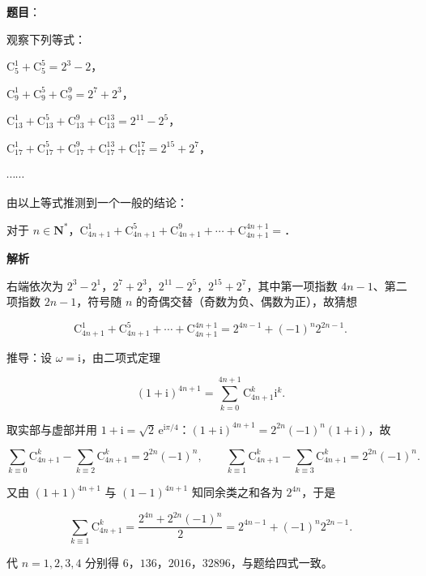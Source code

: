 \begin{answer}

\textbf{题目}：

观察下列等式：

$\mathrm C_5^1+\mathrm C_5^5=2^3-2$，

$\mathrm C_9^1+\mathrm C_9^5+\mathrm C_9^9=2^7+2^3$，

$\mathrm C_{13}^1+\mathrm C_{13}^5+\mathrm C_{13}^9+\mathrm C_{13}^{13}=2^{11}-2^5$，

$\mathrm C_{17}^1+\mathrm C_{17}^5+\mathrm C_{17}^9+\mathrm C_{17}^{13}+\mathrm C_{17}^{17}=2^{15}+2^7$，

$\cdots\cdots$

由以上等式推测到一个一般的结论：

对于 $n\in\mathbf N^*$，$\mathrm C_{4n+1}^1+\mathrm C_{4n+1}^5+\mathrm C_{4n+1}^9+\cdots+\mathrm C_{4n+1}^{4n+1}=$\gkblank{}．

\textbf{解析}

右端依次为 $2^3-2^1$，$2^7+2^3$，$2^{11}-2^5$，$2^{15}+2^7$，其中第一项指数 $4n-1$、第二项指数 $2n-1$，符号随 $n$ 的奇偶交替（奇数为负、偶数为正），故猜想

\nopagebreak[4]
\[\mathrm C_{4n+1}^1+\mathrm C_{4n+1}^5+\cdots+\mathrm C_{4n+1}^{4n+1}=2^{4n-1}+(-1)^n2^{2n-1}.\]

推导：设 $\omega=\mathrm i$，由二项式定理

\nopagebreak[4]
\[(1+\mathrm i)^{4n+1}=\sum_{k=0}^{4n+1}\mathrm C_{4n+1}^k\mathrm i^k.\]

取实部与虚部并用 $1+\mathrm i=\sqrt2\,\mathrm e^{\mathrm i\pi/4}$：$(1+\mathrm i)^{4n+1}=2^{2n}(-1)^n(1+\mathrm i)$，故

\nopagebreak[4]
\[\sum_{k\equiv0}\mathrm C_{4n+1}^k-\sum_{k\equiv2}\mathrm C_{4n+1}^k=2^{2n}(-1)^n,\qquad
\sum_{k\equiv1}\mathrm C_{4n+1}^k-\sum_{k\equiv3}\mathrm C_{4n+1}^k=2^{2n}(-1)^n.\]

又由 $(1+1)^{4n+1}$ 与 $(1-1)^{4n+1}$ 知同余类之和各为 $2^{4n}$，于是

\nopagebreak[4]
\[\sum_{k\equiv1}\mathrm C_{4n+1}^k=\frac{2^{4n}+2^{2n}(-1)^n}{2}=2^{4n-1}+(-1)^n2^{2n-1}.\]

代 $n=1,2,3,4$ 分别得 $6$，$136$，$2016$，$32896$，与题给四式一致。


\end{answer}
